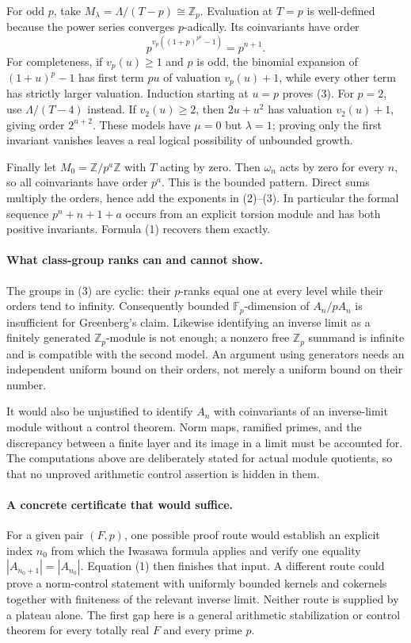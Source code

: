 \documentclass[11pt]{article}
\begin{document}
For odd $p$, take $M_\lambda=\Lambda/(T-p)\cong\mathbb Z_p$.
Evaluation at $T=p$ is well-defined because the power series converges
$p$-adically. Its coinvariants have order
\[
 p^{v_p((1+p)^{p^n}-1)}=p^{n+1}.                    \tag{3}
\]
For completeness, if $v_p(u)\ge1$ and $p$ is odd, the binomial
expansion of $(1+u)^p-1$ has first term $pu$ of valuation
$v_p(u)+1$, while every other term has strictly larger valuation.
Induction starting at $u=p$ proves (3). For $p=2$, use
$\Lambda/(T-4)$ instead. If $v_2(u)\ge2$, then $2u+u^2$ has valuation
$v_2(u)+1$, giving order $2^{n+2}$. These models have $\mu=0$ but
$\lambda=1$; proving only the first invariant vanishes leaves a real
logical possibility of unbounded growth.

Finally let $M_0=\mathbb Z/p^a\mathbb Z$ with $T$ acting by zero.
Then $\omega_n$ acts by zero for every $n$, so all coinvariants have
order $p^a$. This is the bounded pattern. Direct sums multiply the
orders, hence add the exponents in (2)--(3). In particular the formal
sequence $p^n+n+1+a$ occurs from an explicit torsion module and has
both positive invariants. Formula (1) recovers them exactly.

\paragraph{What class-group ranks can and cannot show.}
The groups in (3) are cyclic: their $p$-ranks equal one at every level
while their orders tend to infinity. Consequently bounded
$\mathbb F_p$-dimension of $A_n/pA_n$ is insufficient for Greenberg's
claim. Likewise identifying an inverse limit as a finitely generated
$\mathbb Z_p$-module is not enough; a nonzero free $\mathbb Z_p$
summand is infinite and is compatible with the second model.
An argument using generators needs an independent uniform bound on
their orders, not merely a uniform bound on their number.

It would also be unjustified to identify $A_n$ with coinvariants of an
inverse-limit module without a control theorem. Norm maps, ramified
primes, and the discrepancy between a finite layer and its image in a
limit must be accounted for. The computations above are deliberately
stated for actual module quotients, so that no unproved arithmetic
control assertion is hidden in them.

\paragraph{A concrete certificate that would suffice.}
For a given pair $(F,p)$, one possible proof route would establish an
explicit index $n_0$ from which the Iwasawa formula applies and verify
one equality $|A_{n_0+1}|=|A_{n_0}|$. Equation (1) then finishes that
input. A different route could prove a norm-control statement with
uniformly bounded kernels and cokernels together with finiteness of
the relevant inverse limit. Neither route is supplied by a plateau
alone. The first gap here is a general arithmetic stabilization or
control theorem for every totally real $F$ and every prime $p$.
\end{document}
